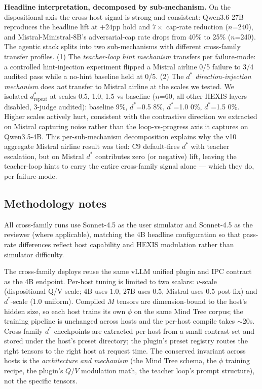 \textbf{Headline interpretation, decomposed by sub-mechanism.} On the dispositional axis the cross-host signal is strong and consistent: Qwen3.6-27B reproduces the headline lift at $+24$pp hold and $7\times$ cap-rate reduction ($n$=240), and Mistral-Ministral-8B's adversarial-cap rate drops from 40\% to 25\% ($n$=240). The agentic stack splits into two sub-mechanisms with different cross-family transfer profiles. (1) The \emph{teacher-loop hint mechanism} transfers per failure-mode: a controlled hint-injection experiment flipped a Mistral airline 0/5 failure to 3/4 audited pass while a no-hint baseline held at 0/5. (2) The \emph{$d^*$ direction-injection mechanism} does \emph{not} transfer to Mistral airline at the scales we tested. We isolated $d^*_\text{repeat}$ at scales 0.5, 1.0, 1.5 vs baseline ($n$=60, all other HEXIS layers disabled, 3-judge audited): baseline 9\%, $d^*$=0.5 8\%, $d^*$=1.0 0\%, $d^*$=1.5 0\%. Higher scales actively hurt, consistent with the contrastive direction we extracted on Mistral capturing noise rather than the loop-vs-progress axis it captures on Qwen3.5-4B. This per-sub-mechanism decomposition explains why the v10 aggregate Mistral airline result was tied: C9 default-fires $d^*$ with teacher escalation, but on Mistral $d^*$ contributes zero (or negative) lift, leaving the teacher-loop hints to carry the entire cross-family signal alone --- which they do, per failure-mode.

\subsection{Methodology notes}

All cross-family runs use Sonnet-4.5 as the user simulator and Sonnet-4.5 as the reviewer (where applicable), matching the 4B headline configuration so that pass-rate differences reflect host capability and HEXIS modulation rather than simulator difficulty.

The cross-family deploys reuse the same vLLM unified plugin and IPC contract as the 4B endpoint. Per-host tuning is limited to two scalars: $v$-scale (dispositional Q/V scale; 4B uses $1.0$, 27B uses $0.5$, Mistral uses $0.5$ post-fix) and $d^*$-scale ($1.0$ uniform). Compiled $M$ tensors are dimension-bound to the host's hidden size, so each host trains its own $\phi$ on the same Mind Tree corpus; the training pipeline is unchanged across hosts and the per-host compile takes $\sim$20s. Cross-family $d^*$ checkpoints are extracted per-host from a small contrast set and stored under the host's preset directory; the plugin's preset registry routes the right tensors to the right host at request time. The conserved invariant across hosts is the \emph{architecture and mechanism} (the Mind Tree schema, the $\phi$ training recipe, the plugin's $Q$/$V$ modulation math, the teacher loop's prompt structure), not the specific tensors.

